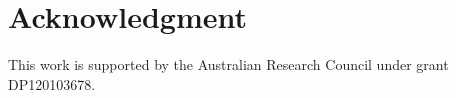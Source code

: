 \documentclass[conference]{IEEEtran}
\begin{document}
\section*{Acknowledgment}
This work is supported by the Australian Research Council under grant DP120103678.








%
%
%

\end{document}
